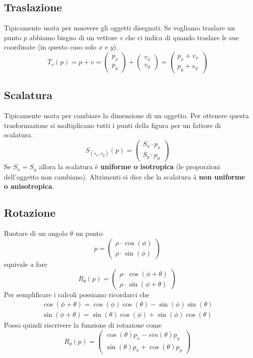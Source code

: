 \subsection{Traslazione}
Tipicamente usata per muovere gli oggetti disegnati. Se vogliamo traslare un punto $p$ abbiamo
bisgno di un vettore $v$ che ci indica di quando traslare le sue coordinate (in questo caso
solo $x$ e $y$).
\[
	T_v(p) = p + v =
	\begin{pmatrix}
		p_x \\ p_y
	\end{pmatrix} +
	\begin{pmatrix}
		v_x \\ v_y
	\end{pmatrix} =
	\begin{pmatrix}
		p_x + v_x \\ p_y + v_y
	\end{pmatrix}
\]

\subsection{Scalatura}
Tipicamente usata per cambiare la dimensione di un oggetto. Per ottenere questa trasformazione
si moltiplicano tutti i punti della figura per un fattore di scalatura.
\[
	S_{(s_x, s_y)}(p) =
	\begin{pmatrix}
		S_x \cdot p_x \\
		S_y \cdot p_y
	\end{pmatrix}
\]
Se $S_x = S_y$ allora la scalatura \`e \textbf{uniforme o isotropica} (le proporzioni
dell'oggetto non cambiano). Altrimenti si dice che la scalatura \`a
\textbf{non uniforme o anisotropica}.

\subsection{Rotazione}
Ruotare di un angolo $\theta$ un punto
\[
	p = \begin{pmatrix}
		\rho \cdot \cos(\phi) \\
		\rho \cdot \sin(\phi)
	\end{pmatrix}\]
equivale a fare
\[
	R_\theta(p) =
	\begin{pmatrix}
		\rho \cdot \cos(\phi + \theta) \\
		\rho \cdot \sin(\phi + \theta)
	\end{pmatrix}
\]
Per semplificare i calcoli possiamo ricordarci che
\begin{gather*}
	\cos(\phi + \theta) = \cos(\phi) \cos(\theta) - \sin(\phi) \sin(\theta) \\
	\sin(\phi + \theta) = \sin(\theta) \cos(\phi) + \sin(\phi) \cos(\theta)
\end{gather*}
Posso quindi riscrivere la funzione di rotazione come
\[
	R_\theta(p) =
	\begin{pmatrix}
		\cos(\theta)p_x - sin(\theta)p_y \\
		\sin(\theta)p_x + \cos(\theta)p_y
	\end{pmatrix}\]
